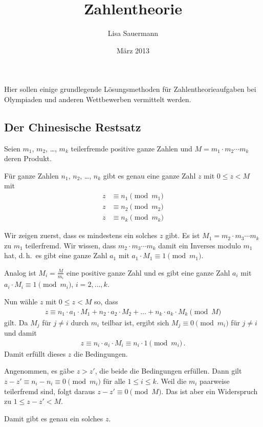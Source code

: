 \documentclass[11pt,a4paper]{article}
\title{Zahlentheorie\kosemnetlicensemark}
\author{Lisa Sauermann}
\date{März 2013}
\begin{document}
\maketitle

Hier sollen einige grundlegende Lösungsmethoden für Zahlentheorieaufgaben bei
Olympiaden und anderen Wettbewerben vermittelt werden.

\subsection*{Der Chinesische Restsatz}
\begin{satz}
Seien $m_{1}$, $m_{2}$, \dots , $m_{k}$ teilerfremde positive ganze Zahlen und
$M=m_{1}\cdot m_{2}\cdots m_{k}$ deren Produkt.  

Für ganze Zahlen $n_{1}$, $n_{2}$, \dots , $n_{k}$ gibt es genau eine ganze
Zahl $z$ mit $0\le z<M$ mit
\begin{align*}
z&\equiv n_{1}\pmod{m_{1}}\\ z&\equiv n_{2}\pmod{m_{2}}\\ 
z&\equiv n_{k}\pmod{m_{k}}
\end{align*}
\end{satz}
\begin{beweis}
Wir zeigen zuerst, dass es mindestens ein solches $z$ gibt. Es ist
$M_1=m_{2}\cdot m_{3}\cdots m_{k}$ zu $m_{1}$ teilerfremd. Wir wissen, dass
$m_{2}\cdot m_{3}\cdots m_{k}$ damit ein Inverses modulo $m_{1}$ hat,
d.\,h.\ es gibt eine ganze Zahl $a_{1}$ mit $a_{1}\cdot M_1\equiv
1\pmod{m_{1}}$.

Analog ist $M_i=\frac{M}{m_{i}}$ eine positive ganze Zahl und es gibt eine
ganze Zahl $a_{i}$ mit $a_{i}\cdot M_i\equiv 1\pmod{m_{i}}$, $i=2,\dots,k$.

Nun wähle $z$ mit $0\le z<M$ so, dass
\begin{gather*}
  z\equiv n_{1}\cdot a_{1}\cdot M_1 +n_{2}\cdot a_{2}\cdot M_2 +\dots
  +n_{k}\cdot a_{k}\cdot M_k \pmod{M}
\end{gather*}
gilt.  Da $M_j$ für $j\neq i$ durch $m_i$ teilbar ist, ergibt sich $M_j\equiv
0\pmod{m_i}$ für $j\neq i$ und damit 
\begin{gather*}
  z\equiv n_{i}\cdot a_{i}\cdot M_i \equiv n_{i}\cdot 1\pmod{m_{i}}\,.
\end{gather*}
Damit erfüllt dieses $z$ die Bedingungen.

Angenommen, es gäbe $z>z'$, die beide die Bedingungen erfüllen. Dann gilt
$z-z'\equiv n_{i}-n_{i}\equiv 0\pmod{m_{i}}$ für alle $1\leq i\leq k$. Weil
die $m_{i}$ paarweise teilerfremd sind, folgt daraus $z-z'\equiv 0
\pmod{M}$. Das ist aber ein Widerspruch zu $1\leq z-z'<M$.

Damit gibt es genau ein solches $z$.
\end{beweis}
\end{document}
